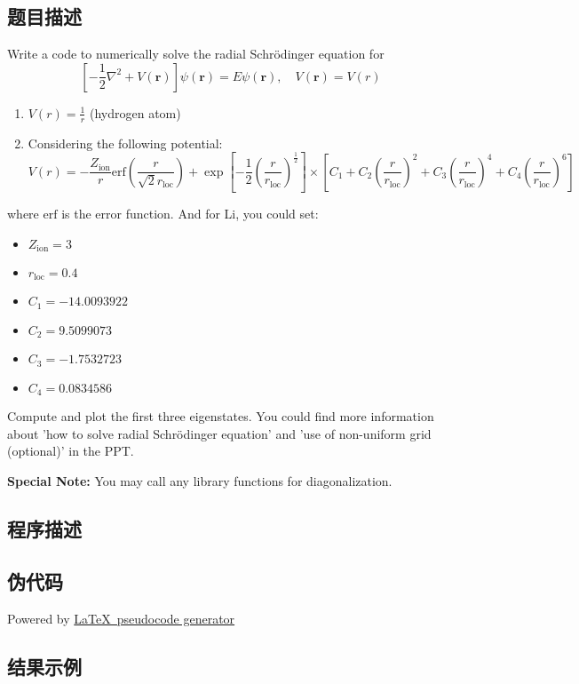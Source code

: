 \subsection{题目描述}
\noindent Write a code to numerically solve the radial Schrödinger equation for
\[
\left[-\frac{1}{2}\nabla^2+V(\mathbf{r})\right]\psi(\mathbf{r})=E\psi(\mathbf{r}), \quad V(\mathbf{r})=V(r)
\]
\begin{enumerate}
    \item \( V(r) = \frac{1}{r} \) (hydrogen atom)
    \item Considering the following potential:
    \[
    V(r) = -\frac{Z_{\text{ion}}}{r}\text{erf}\left(\frac{r}{\sqrt{2} r_{\text{loc}}}\right) 
    + \exp \left[ -\frac{1}{2} \left(\frac{r}{r_{\text{loc}}}\right)^{\frac{1}{2}}\right]
    \times \left[C_1 + C_2\left(\frac{r}{r_{\text{loc}}}\right)^2+C_3\left(\frac{r}{r_{\text{loc}}}\right)^4+C_4\left(\frac{r}{r_{\text{loc}}}\right)^6\right]
    \]
\end{enumerate}
where \(\text{erf}\) is the error function. And for Li, you could set:
\begin{itemize}
    \item \( Z_{\text{ion}}=3 \)
    \item \( r_{\text{loc}}=0.4 \)
    \item \( C_1=-14.0093922 \)
    \item \( C_2=9.5099073 \)
    \item \( C_3=-1.7532723 \)
    \item \( C_4=0.0834586 \)
\end{itemize}
\noindent Compute and plot the first three eigenstates. You could find more information about 'how to solve radial Schrödinger equation' and 'use of non-uniform grid (optional)' in the PPT.

\textbf{Special Note:} You may call any library functions for diagonalization.


\subsection{程序描述}

\subsection{伪代码}
Powered by \href{https://chatgpt.com/g/g-xJJAA2awf-latex-pseudocode-generator}{\LaTeX \ pseudocode generator}

\subsection{结果示例}

